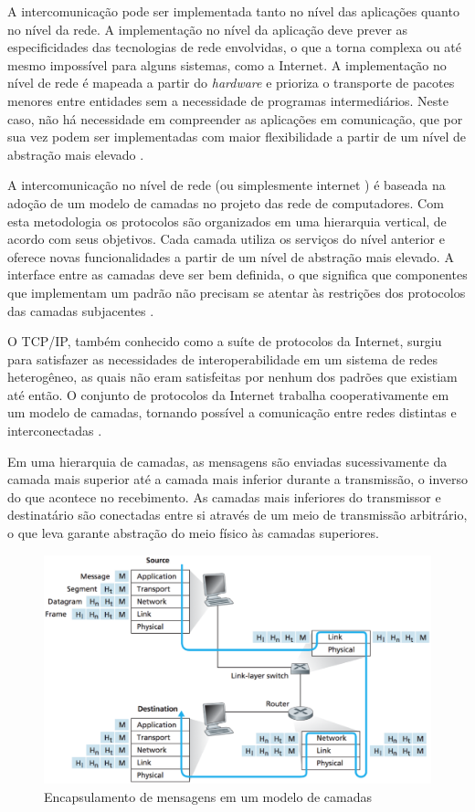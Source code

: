 A intercomunicação pode ser implementada tanto no nível das aplicações quanto no
nível da rede. A implementação no nível da aplicação deve prever as especificidades
das tecnologias de rede envolvidas, o que a torna complexa ou até mesmo impossível
para alguns sistemas, como a Internet. A implementação no nível de rede é mapeada
a partir do \textit{hardware} e prioriza o transporte de pacotes menores entre
entidades sem a necessidade de programas intermediários. Neste caso, não há
necessidade em compreender as aplicações em comunicação, que por sua vez podem ser
implementadas com maior flexibilidade a partir de um nível de abstração mais elevado
\cite{comer2000}.

A intercomunicação no nível de rede (ou simplesmente internet \cite{comer2000}) é
baseada na adoção de um modelo de camadas no projeto das rede de computadores. Com
esta metodologia os protocolos são organizados em uma hierarquia vertical, de acordo
com seus objetivos. Cada camada utiliza os serviços do nível anterior e oferece
novas funcionalidades a partir de um nível de abstração mais elevado. A interface
entre as camadas deve ser bem definida, o que significa que componentes que
implementam um padrão não precisam se atentar às restrições dos protocolos das
camadas subjacentes \cite{kurose2012}.

O TCP/IP, também conhecido como a suíte de protocolos da Internet, surgiu para
satisfazer as necessidades de interoperabilidade em um sistema de redes heterogêneo,
as quais não eram satisfeitas por nenhum dos padrões que existiam até então. O
conjunto de protocolos da Internet trabalha cooperativamente em um modelo de
camadas, tornando possível a comunicação entre redes distintas e interconectadas
\cite{comer2000}.

Em uma hierarquia de camadas, as mensagens são enviadas sucessivamente da camada
mais superior até a camada mais inferior durante a transmissão, o inverso do que
acontece no recebimento. As camadas mais inferiores do transmissor e destinatário
são conectadas entre si através de um meio de transmissão arbitrário, o que leva
garante abstração do meio físico às camadas superiores.

\begin{figure}[h]
	\centering
		\includegraphics[keepaspectratio=true,scale=0.6]{figuras/encapsulamento.eps}
	\caption{Encapsulamento de mensagens em um modelo de camadas \cite{kurose2012}}
	\label{fig:encapsulamento}
\end{figure}

